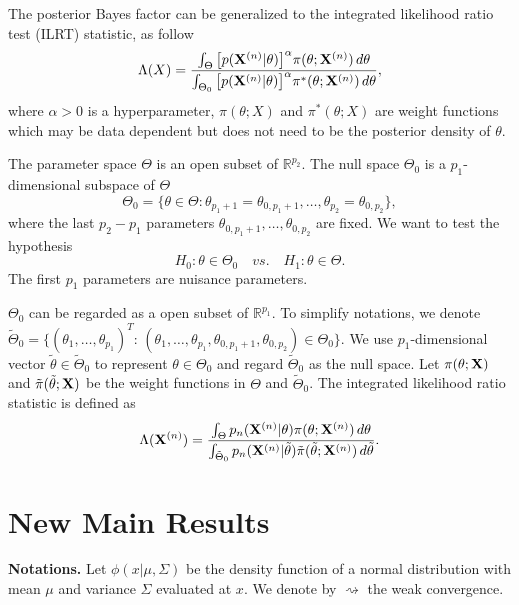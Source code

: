 \documentclass[3p]{elsarticle}
\theoremstyle{plain}
\theoremstyle{definition}
\theoremstyle{remark}
\begin{document}
 The posterior Bayes factor can be generalized to the integrated likelihood ratio test (ILRT) statistic, as follow  
\begin{equation}
    \Lambda (X)=\frac{\int_{\Theta} \big[p(\mathbf{X}^{(n)}|\theta)\big]^{\alpha}\pi(\theta;\mathbf{X}^{(n)})\,d\theta}{\int_{\Theta_0} \big[p(\mathbf{X}^{(n)}|\theta)\big]^{\alpha}\pi^*(\theta;\mathbf{X}^{(n)})\,d\theta},
\end{equation}
where $\alpha>0$ is a hyperparameter, $\pi(\theta;X)$ and $\pi^*(\theta;X)$ are weight functions which may be data dependent but does not need to be the posterior density of $\theta$.

The parameter space $\Theta$ is an open subset of $\mathbb{R}^{p_2}$. The null space $\Theta_0$ is a $p_1$-dimensional subspace of $\Theta$
\begin{equation}
    \Theta_0=\{\theta\in\Theta:\theta_{p_1+1}=\theta_{0,{p_1+1}},\ldots,\theta_{p_2}=\theta_{0,{p_2}}\},
\end{equation}
where the last $p_2-p_1$ parameters $\theta_{0,{p_1+1}},\ldots,\theta_{0,{p_2}}$ are fixed. We want to test the hypothesis
\begin{equation}
H_0:\theta\in \Theta_0\quad vs. \quad H_1:\theta\in \Theta.
\end{equation}
The first $p_1$ parameters are nuisance parameters.

$\Theta_0$ can be regarded as a open subset of $\mathbb{R}^{p_1}$. To simplify notations, we denote  $\tilde{\Theta}_0=\{{(\theta_1,\ldots,\theta_{p_1})}^T:\, (\theta_1,\ldots,\theta_{p_1},\theta_{0,p_1+1},\theta_{0,p_2})\in \Theta_0\}$.
We use $p_1$-dimensional vector $\tilde{\theta}\in
\tilde{\Theta}_0$ to represent $\theta\in\Theta_0$ and regard $\tilde{\Theta}_0$ as the null space.
Let $\pi(\theta;\mathbf{X})$ and $\tilde{\pi}(\tilde{\theta};\mathbf{X})$ be the weight functions in $\Theta$ and $\tilde{\Theta}_0$.
The integrated likelihood ratio statistic is defined as
\begin{equation}\label{likelihoodRatio}
    \Lambda (\mathbf{X}^{(n)})=\frac{\int_{\Theta} p_n(\mathbf{X}^{(n)}|\theta)\pi(\theta;\mathbf{X}^{(n)})\,d\theta}{\int_{\tilde{\Theta}_0} p_n(\mathbf{X}^{(n)}|\tilde{\theta})\tilde{\pi}(\tilde{\theta};\mathbf{X}^{(n)})\,d\tilde{\theta}}.
\end{equation}

\section{New Main Results}
\textbf{Notations.}
Let $\phi(x|\mu,\Sigma)$ be the density function of a normal distribution with mean $\mu$ and variance $\Sigma$ evaluated at $x$.
We denote by $\rightsquigarrow$ the weak convergence. 
\end{document}
